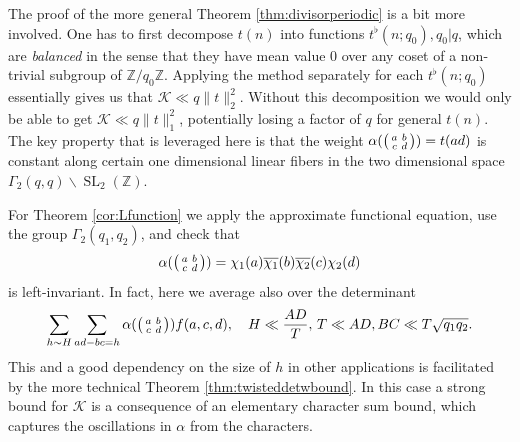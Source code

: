 \documentclass[12pt]{amsart}
\theoremstyle{definition}
\theoremstyle{remark}
\numberwithin{equation}{section}
\newcommand{\Z}{{\mathbb Z}}
\newcommand{\1}{{\mathbf 1}}
\newcommand{\SL}{\operatorname{SL}_2}
\begin{document}
The proof of the more general Theorem \ref{thm:divisorperiodic} is a  bit more involved. One has to first decompose $t(n)$ into functions $t^{\flat}(n;q_0),q_0|q$, which are \emph{balanced} in the sense that they have mean value 0 over any coset of a non-trivial subgroup of $\Z/q_0\Z$. Applying the method separately for each $t^{\flat}(n;q_0)$ essentially gives us that $\mathcal{K} \ll q \|t\|_2^2$. Without this decomposition we would only be able to get $\mathcal{K} \ll q \|t\|_1^2$,  potentially losing a factor of $q$ for general $t(n)$. The key property that is leveraged here is that the weight $\alpha(\smqty(a & b \\ c &d)) = t(ad)$ is constant along certain one dimensional linear fibers in the two dimensional space $\Gamma_2(q,q) \backslash \SL(\Z)$.

For Theorem \ref{cor:Lfunction} we apply the approximate functional equation,  use the group $\Gamma_2(q_1,q_2)$, and check that
\begin{align*}
    \alpha(\smqty(a &b \\ c& d)) = \chi_1(a) \overline{\chi_1}(b) \overline{\chi_2}(c) \chi_2(d)
\end{align*}
is left-invariant. In fact, here we average also over the determinant
\begin{align*}
    \sum_{h \sim H} \sum_{ad-bc=h}     \alpha(\smqty(a &b \\ c& d))f(a,c,d), \quad H \ll \frac{AD}{T}, \, T \ll AD,BC \ll T \sqrt{q_1q_2} .
\end{align*}
This and a good dependency on the size of $h$ in other applications is facilitated by the more technical Theorem \ref{thm:twisteddetwbound}. In this case a strong bound for $\mathcal{K}$ is a consequence of an elementary character sum bound, which captures the oscillations in $\alpha$ from the characters.
\end{document}
